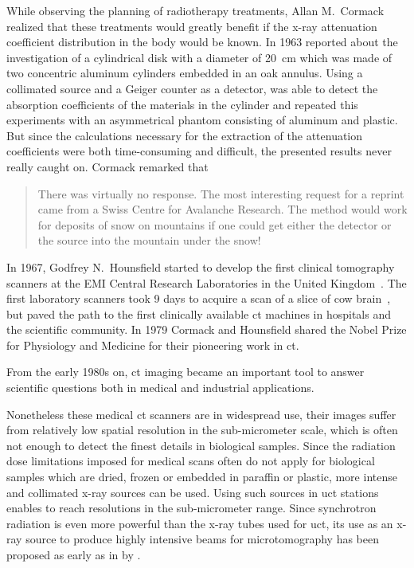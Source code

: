 While observing the planning of radiotherapy treatments, Allan M.\ Cormack realized that these treatments would greatly benefit if the x-ray attenuation coefficient distribution in the body would be known. In 1963 \citet{Cormack1963} reported about the investigation of a cylindrical disk with a diameter of \SI{20}{\centi\meter} which was made of two concentric aluminum cylinders embedded in an oak annulus. Using a collimated  source and a Geiger counter as a detector, \citeauthor{Cormack1963} was able to detect the absorption coefficients of the materials in the cylinder and repeated this experiments with an asymmetrical phantom consisting of aluminum and plastic. But since the calculations necessary for the extraction of the attenuation coefficients were both time-consuming and difficult, the presented results never really caught on. Cormack remarked that \begin{quote} There was virtually no response. The most interesting request for a reprint came from a Swiss Centre for Avalanche Research. The method would work for deposits of snow on mountains if one could get either the detector or the source into the mountain under the snow! \cite{Cormack1979}\end{quote}

In 1967, Godfrey N.\ Hounsfield started to develop the first clinical tomography scanners at the EMI Central Research Laboratories in the United Kingdom~\cite{Hsieh2003}. The first laboratory scanners took 9 days to acquire a scan of a slice of cow brain~\cite{Hounsfield1976}, but paved the path to the first clinically available \ac{ct} machines in hospitals and the scientific community. In 1979 Cormack and Hounsfield shared the Nobel Prize for Physiology and Medicine for their pioneering work in \ac{ct}.

From the early 1980s on, \ac{ct} imaging became an important tool to answer scientific questions both in medical and industrial applications.

Nonetheless these medical \ac{ct} scanners are in widespread use, their images suffer from relatively low spatial resolution in the sub-micrometer scale, which is often not enough to detect the finest details in biological samples. Since the radiation dose limitations imposed for medical scans often do not apply for biological samples which are dried, frozen or embedded in paraffin or plastic, more intense and collimated x-ray sources can be used. Using such sources in \ac{uct} stations enables to reach resolutions in the sub-micrometer range. Since synchrotron radiation is even more powerful than the x-ray tubes used for \ac{uct}, its use as an x-ray source to produce highly intensive beams for microtomography has been proposed as early as in \citeyear{Grodzins1983} by \citet{Grodzins1983,Grodzins1983a}.

